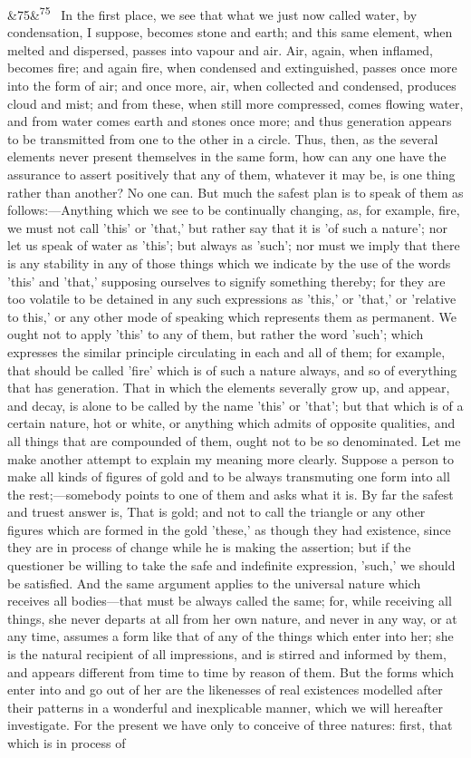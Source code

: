 \documentclass[12pt]{article}
\newcommand{\para}[1][]{\par\noindent\ifx&#1&\else\textsuperscript{\footnotesize #1}~\fi}
\begin{document}
\para[75] In the first place, we see that what we just now called water, by condensation, I suppose, becomes stone and earth; and this same element, when melted and dispersed, passes into vapour and air. Air, again, when inflamed, becomes fire; and again fire, when condensed and extinguished, passes once more into the form of air; and once more, air, when collected and condensed, produces cloud and mist; and from these, when still more compressed, comes flowing water, and from water comes earth and stones once more; and thus generation appears to be transmitted from one to the other in a circle. Thus, then, as the several elements never present themselves in the same form, how can any one have the assurance to assert positively that any of them, whatever it may be, is one thing rather than another? No one can. But much the safest plan is to speak of them as follows:---Anything which we see to be continually changing, as, for example, fire, we must not call 'this' or 'that,' but rather say that it is 'of such a nature'; nor let us speak of water as 'this'; but always as 'such'; nor must we imply that there is any stability in any of those things which we indicate by the use of the words 'this' and 'that,' supposing ourselves to signify something thereby; for they are too volatile to be detained in any such expressions as 'this,' or 'that,' or 'relative to this,' or any other mode of speaking which represents them as permanent. We ought not to apply 'this' to any of them, but rather the word 'such'; which expresses the similar principle circulating in each and all of them; for example, that should be called 'fire' which is of such a nature always, and so of everything that has generation. That in which the elements severally grow up, and appear, and decay, is alone to be called by the name 'this' or 'that'; but that which is of a certain nature, hot or white, or anything which admits of opposite qualities, and all things that are compounded of them, ought not to be so denominated. Let me make another attempt to explain my meaning more clearly. Suppose a person to make all kinds of figures of gold and to be always transmuting one form into all the rest;---somebody points to one of them and asks what it is. By far the safest and truest answer is, That is gold; and not to call the triangle or any other figures which are formed in the gold 'these,' as though they had existence, since they are in process of change while he is making the assertion; but if the questioner be willing to take the safe and indefinite expression, 'such,' we should be satisfied. And the same argument applies to the universal nature which receives all bodies---that must be always called the same; for, while receiving all things, she never departs at all from her own nature, and never in any way, or at any time, assumes a form like that of any of the things which enter into her; she is the natural recipient of all impressions, and is stirred and informed by them, and appears different from time to time by reason of them. But the forms which enter into and go out of her are the likenesses of real existences modelled after their patterns in a wonderful and inexplicable manner, which we will hereafter investigate. For the present we have only to conceive of three natures: first, that which is in process of 
\end{document}
